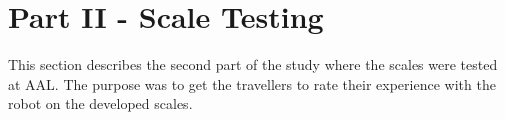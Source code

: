 \section{Part II - Scale Testing}
\label{MethodScaleTesting}
This section describes the second part of the study where the scales were tested at AAL. The purpose was to get the travellers to rate their experience with the robot on the developed scales.
%




